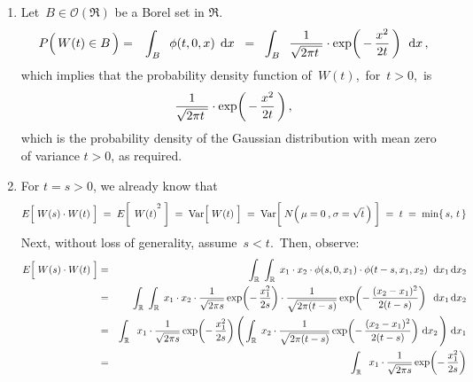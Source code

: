 \begin{enumerate}
\item
	Let \,$B \in \mathcal{O}(\Re)$ be a Borel set in $\Re$.
	\begin{eqnarray*}
	P\!\left(\,W(t) \overset{{\color{white}.}}{\in} B\,\right)
	& = &
		\int_{B}\;\;
			\phi(t,0,x)
		\;\,\d x
	\;\; = \;\;
		\int_{B}\;\;
			\dfrac{1}{\sqrt{2\pi t{\color{white}.}}}
			\cdot
			\exp\!\left(\,-\,\dfrac{x^{2}}{2 t}\,\right)
		\;\,\d x\,,
	\end{eqnarray*}
	which implies that the probability density function of \,$W(t)$,\, for \,$t > 0$,\, is
	\begin{equation*}
		\dfrac{1}{\sqrt{2\pi t{\color{white}.}}}
		\cdot
		\exp\!\left(\,-\,\dfrac{x^{2}}{2 t}\,\right),
	\end{equation*}
	which is the probability density of the Gaussian distribution with mean zero of variance $t > 0$, as required.
\item
	For $t = s > 0$, we already know that
	\begin{equation*}
	E\!\left[\;\overset{{\color{white}.}}{W(s)} \cdot W(t)\;\right]
	\;=\; E\!\left[\;\,\overset{{\color{white}.}}{W(t)}^{2}\;\right]
	\;=\; \Var\!\left[\;\overset{{\color{white}.}}{W(t)} \;\right]
	\;=\; \Var\!\left[\; \overset{{\color{white}.}}{N\!\left(\,\mu = 0 \,\overset{{\color{white}1}}{,}\, \sigma = \sqrt{t}\,\right)} \;\right]
	\;=\; t
	\;=\; \min\{\,s,\,t\,\}
	\end{equation*}
	Next, without loss of generality, assume \,$s < t$.\,
	Then, observe:
	\begin{eqnarray*}
	E\!\left[\;\overset{{\color{white}.}}{W(s)} \cdot W(t)\;\right]
	& = &
		\int_{\Re} \; \int_{\Re}\;
			x_{1} \cdot x_{2} 
			\cdot
			\phi(s,0,x_{1})
			\cdot
			\phi(t - s,x_{1},x_{2})
		\;\;\d x_{1}\,\d x_{2}
	\\
	& = &
		\int_{\Re} \; \int_{\Re}\;
			x_{1} \cdot x_{2} 
			\cdot
			\dfrac{1}{\sqrt{2\pi s}}\exp\!\left(-\,\dfrac{x_{1}^{2}}{2s}\right)
			\cdot
			\dfrac{1}{\sqrt{2\pi(t-s)}}\exp\!\left(-\,\dfrac{(x_{2}-x_{1})^{2}}{2(t-s)}\right)
		\;\;\d x_{1}\,\d x_{2}
	\\
	& = &
		\int_{\Re}\;\;
			x_{1} \cdot
			\dfrac{1}{\sqrt{2\pi s}}\exp\!\left(-\,\dfrac{x_{1}^{2}}{2s}\right)
			\left(\,\int_{\Re}\;
				 x_{2} 
				\cdot
				\dfrac{1}{\sqrt{2\pi(t-s)}}\exp\!\left(-\,\dfrac{(x_{2}-x_{1})^{2}}{2(t-s)}\right)
				\,\d x_{2}\,\right)
			\,\d x_{1}
	\\
	& = &
		\int_{\Re}\;\;
			x_{1} \cdot
			\dfrac{1}{\sqrt{2\pi s}}\exp\!\left(-\,\dfrac{x_{1}^{2}}{2s}\right)

\end{eqnarray*}
\end{enumerate}
